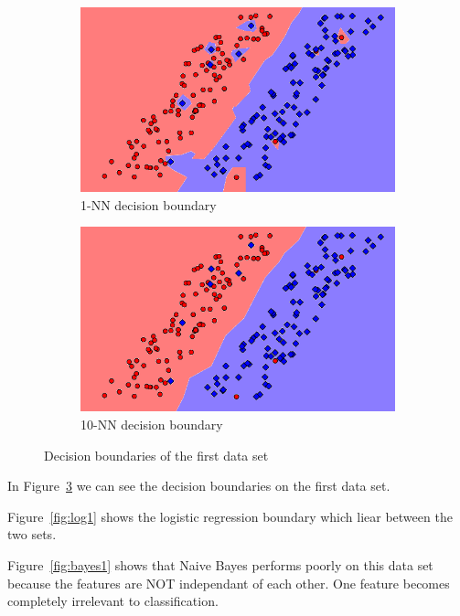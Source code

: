\documentclass[letterpaper,10pt]{article} %
\begin{document}
\begin{figure}[h]
\begin{subfigure}[b]{\textwidth}
\includegraphics[width=\textwidth]{handout/q3-1-NN}
\caption{1-NN decision boundary}
\label{fig:1nn1}
\end{subfigure}

\begin{subfigure}[b]{\textwidth}
\includegraphics[width=\textwidth]{handout/q3-1-10NN}
\caption{10-NN decision boundary}
\label{fig:10nn1}
\end{subfigure}

\caption{Decision boundaries of the first data set}\label{fig:decision1}
\end{figure}

In Figure~\ref{fig:decision1} we can see the decision boundaries on the first data set. 

Figure~\ref{fig:log1} shows the logistic regression boundary which liear between the two sets. 

Figure~\ref{fig:bayes1} shows that Naive Bayes performs poorly on this data set because the features are NOT independant of each other. One feature becomes completely irrelevant to classification.
\end{document}
